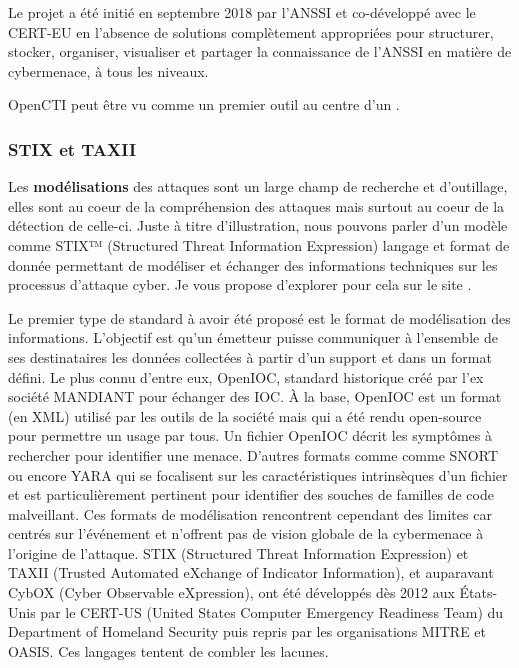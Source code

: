 Le projet  a été initié en septembre 2018 par l’ANSSI et co-développé avec le CERT-EU en l’absence de solutions complètement appropriées pour structurer, stocker, organiser, visualiser et partager la connaissance de l’ANSSI en matière de cybermenace, à tous les niveaux.

OpenCTI peut être vu comme un premier outil au centre d'un .




\subsubsection{STIX et TAXII}


Les \textbf{modélisations} des attaques sont un large champ de recherche et d'outillage, elles sont au coeur de la compréhension des attaques mais surtout au coeur de la détection de celle-ci. Juste à titre d'illustration, nous pouvons parler d'un modèle comme STIX™ (Structured Threat Information Expression) langage et format de donnée permettant de modéliser et échanger des informations techniques sur les processus d'attaque cyber. 
Je vous propose d'explorer pour cela sur le site .

Le premier type de standard à avoir été proposé est le format de modélisation des informations. L’objectif est qu’un émetteur puisse communiquer à l’ensemble de ses destinataires les données collectées à partir d’un support et dans un format défini. Le plus connu d’entre eux, OpenIOC, standard historique créé par l'ex société MANDIANT  pour échanger des IOC. À la base, OpenIOC est un format (en XML) utilisé par les outils de la société mais qui a été rendu open-source pour permettre un usage par tous. Un fichier OpenIOC décrit les symptômes à rechercher pour identifier une menace.
D’autres formats comme comme SNORT  ou encore YARA qui se focalisent sur les caractéristiques intrinsèques d’un fichier et est particulièrement pertinent pour identifier des souches de familles de code malveillant.
Ces formats de modélisation rencontrent cependant des limites car centrés sur l'événement et n'offrent pas de vision globale de la cybermenace à l’origine de l’attaque. 
STIX (Structured Threat Information Expression) et TAXII (Trusted Automated eXchange of Indicator Information), et auparavant CybOX (Cyber Observable eXpression), ont été développés dès 2012 aux États-Unis par le CERT-US (United States Computer Emergency Readiness Team) du Department of Homeland Security  puis repris par les organisations MITRE et OASIS. Ces langages tentent de combler les lacunes.

